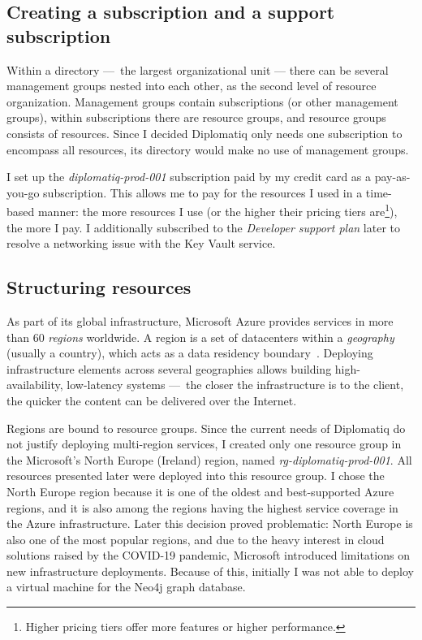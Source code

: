 \subsection{Creating a subscription and a support subscription}

Within a directory — the largest organizational unit — there can be several management groups nested into each other, as the second level of resource organization. Management groups contain subscriptions (or other management groups), within subscriptions there are resource groups, and resource groups consists of resources. Since I decided Diplomatiq only needs one subscription to encompass all resources, its directory would make no use of management groups.

I set up the \emph{diplomatiq-prod-001} subscription paid by my credit card as a pay-as-you-go subscription. This allows me to pay for the resources I used in a time-based manner: the more resources I use (or the higher their pricing tiers are\footnote{Higher pricing tiers offer more features or higher performance.}), the more I pay. I additionally subscribed to the \emph{Developer support plan} later to resolve a networking issue with the Key Vault service.

\subsection{Structuring resources}

As part of its global infrastructure, Microsoft Azure provides services in more than 60 \emph{regions} worldwide. A region is a set of datacenters within a \emph{geography} (usually a country), which acts as a data residency boundary~\cite{azure-global-infrastructure}. Deploying infrastructure elements across several geographies allows building high-availability, low-latency systems — the closer the infrastructure is to the client, the quicker the content can be delivered over the Internet.

Regions are bound to resource groups. Since the current needs of Diplomatiq do not justify deploying multi-region services, I created only one resource group in the Microsoft's North Europe (Ireland) region, named \emph{rg-diplomatiq-prod-001}. All resources presented later were deployed into this resource group. I chose the North Europe region because it is one of the oldest and best-supported Azure regions, and it is also among the regions having the highest service coverage in the Azure infrastructure. Later this decision proved problematic: North Europe is also one of the most popular regions, and due to the heavy interest in cloud solutions raised by the COVID-19 pandemic, Microsoft introduced limitations on new infrastructure deployments. Because of this, initially I was not able to deploy a virtual machine for the Neo4j graph database.

